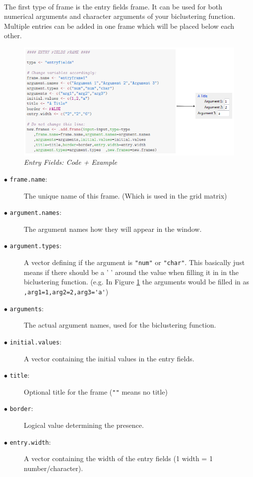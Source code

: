 \documentclass[a4paper]{article}\usepackage[]{graphicx}\usepackage[]{color}
\begin{document}
\\
\noindent The first type of frame is the entry fields frame. It can be used for
both numerical arguments and character arguments of your biclustering function.
Multiple entries can be added in one frame which will be placed below each
other.
\begin{figure}[H]
\centering
\includegraphics[scale=0.5]{figures/entryfields.png}
\caption{{\it Entry Fields: Code + Example}
\label{entryfields}}
\end{figure}

\begin{description}
  \item[$\bullet$ \texttt{frame.name}:] The unique name of this frame. (Which is used in the grid matrix)
  \item[$\bullet$ \texttt{argument.names}:] The argument names how they will
  appear in the window.
  \item[$\bullet$ \texttt{argument.types}:] A vector defining if the argument is
  \verb|"num"| or \verb|"char"|. This basically just means if there should be a
  ' ' around the value when filling it in in the biclustering function. (e.g. In
  Figure \ref{entryfields} the arguments would be filled in as \verb|,arg1=1,arg2=2,arg3='a'|)
  \item[$\bullet$ \texttt{arguments}:] The actual argument names, used for the
  biclustering function.
  \item[$\bullet$ \texttt{initial.values}:] A vector containing the initial
  values in the entry fields.
  \item[$\bullet$ \texttt{title}:] Optional title for the frame (\verb|""| means no title)
  \item[$\bullet$ \texttt{border}:] Logical value determining the presence. 
  \item[$\bullet$ \texttt{entry.width}:] A vector containing the width of the
  entry fields (1 width = 1 number/character).
\end{description}
\end{document}
